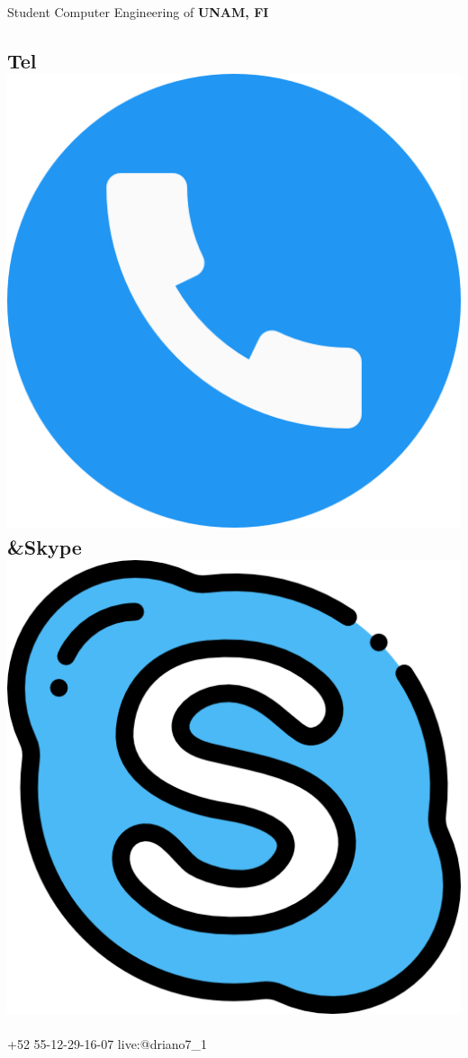 \documentclass[]{friggeri-cv}
\begin{document}
      {Student Computer Engineering of \textbf{UNAM, FI}}
      

\begin{aside}
  \section{Tel\includegraphics[scale=0.025]{logos/telefono.png}\&Skype\includegraphics[scale=0.025]{logos/skype.png}}
    +52 55-12-29-16-07
    live:@driano7\_1
    ~

\end{aside}
\end{document}
